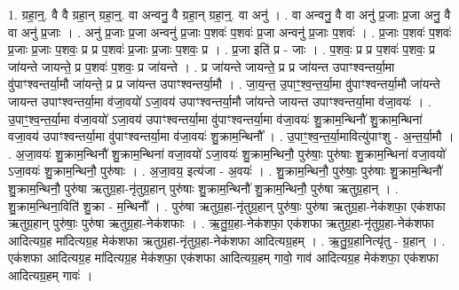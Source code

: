 \documentclass[17pt]{extarticle}
\begin{document}
1. ग्रहा॒न्॒. वै वै ग्रहा॒न् ग्रहा॒न्॒. वा अन्वनु॒ वै ग्रहा॒न् ग्रहा॒न्॒. वा अनु॑ । . वा अन्वनु॒ वै वा अनु॑ प्र॒जाः प्र॒जा अनु॒ वै वा अनु॑ प्र॒जाः । . अनु॑ प्र॒जाः प्र॒जा अन्वनु॑ प्र॒जाः प॒शवः॑ प॒शवः॑ प्र॒जा अन्वनु॑ प्र॒जाः प॒शवः॑ । . प्र॒जाः प॒शवः॑ प॒शवः॑ प्र॒जाः प्र॒जाः प॒शवः॒ प्र प्र प॒शवः॑ प्र॒जाः प्र॒जाः प॒शवः॒ प्र । . प्र॒जा इति॑ प्र - जाः । . प॒शवः॒ प्र प्र प॒शवः॑ प॒शवः॒ प्र जा॑यन्ते जायन्ते॒ प्र प॒शवः॑ प॒शवः॒ प्र जा॑यन्ते । . प्र जा॑यन्ते जायन्ते॒ प्र प्र जा॑यन्त उपाꣳश्वन्तर्या॒मा वु॑पाꣳश्वन्तर्या॒मौ जा॑यन्ते॒ प्र प्र जा॑यन्त उपाꣳश्वन्तर्या॒मौ । . जा॒य॒न्त॒ उ॒पाꣳ॒॒श्व॒न्त॒र्या॒मा वु॑पाꣳश्वन्तर्या॒मौ जा॑यन्ते जायन्त उपाꣳश्वन्तर्या॒मा व॑जा॒वयो॑ ऽजा॒वय॑ उपाꣳश्वन्तर्या॒मौ जा॑यन्ते जायन्त उपाꣳश्वन्तर्या॒मा व॑जा॒वयः॑ । . उ॒पाꣳ॒॒श्व॒न्त॒र्या॒मा व॑जा॒वयो॑ ऽजा॒वय॑ उपाꣳश्वन्तर्या॒मा वु॑पाꣳश्वन्तर्या॒मा व॑जा॒वयः॑ शु॒क्राम॒न्थिनौ॑ शु॒क्राम॒न्थिना॑ वजा॒वय॑ उपाꣳश्वन्तर्या॒मा वु॑पाꣳश्वन्तर्या॒मा व॑जा॒वयः॑ शु॒क्राम॒न्थिनौ᳚ । . उ॒पाꣳ॒॒श्व॒न्त॒र्या॒मावित्यु॑पाꣳशु - अ॒न्त॒र्या॒मौ । . अ॒जा॒वयः॑ शु॒क्राम॒न्थिनौ॑ शु॒क्राम॒न्थिना॑ वजा॒वयो॑ ऽजा॒वयः॑ शु॒क्राम॒न्थिनौ॒ पुरु॑षाः॒ पुरु॑षाः शु॒क्राम॒न्थिना॑ वजा॒वयो॑ ऽजा॒वयः॑ शु॒क्राम॒न्थिनौ॒ पुरु॑षाः । . अ॒जा॒वय॒ इत्य॑जा - अ॒वयः॑ । . शु॒क्राम॒न्थिनौ॒ पुरु॑षाः॒ पुरु॑षाः शु॒क्राम॒न्थिनौ॑ शु॒क्राम॒न्थिनौ॒ पुरु॑षा ऋतुग्र॒हा-नृ॑तुग्र॒हान् पुरु॑षाः शु॒क्राम॒न्थिनौ॑ शु॒क्राम॒न्थिनौ॒ पुरु॑षा ऋतुग्र॒हान् । . शु॒क्राम॒न्थिना॒विति॑ शु॒क्रा - म॒न्थिनौ᳚ । . पुरु॑षा ऋतुग्र॒हा-नृ॑तुग्र॒हान् पुरु॑षाः॒ पुरु॑षा ऋतुग्र॒हा-नेक॑शफा॒ एक॑शफा ऋतुग्र॒हान् पुरु॑षाः॒ पुरु॑षा ऋतुग्र॒हा-नेक॑शफाः । . ऋ॒तु॒ग्र॒हा-नेक॑शफा॒ एक॑शफा ऋतुग्र॒हा-नृ॑तुग्र॒हा-नेक॑शफा आदित्यग्र॒ह मा॑दित्यग्र॒ह मेक॑शफा ऋतुग्र॒हा-नृ॑तुग्र॒हा-नेक॑शफा आदित्यग्र॒हम् । . ऋ॒तु॒ग्र॒हानित्यृ॑तु - ग्र॒हान् । . एक॑शफा आदित्यग्र॒ह मा॑दित्यग्र॒ह मेक॑शफा॒ एक॑शफा आदित्यग्र॒हम् गावो॒ गाव॑ आदित्यग्र॒ह मेक॑शफा॒ एक॑शफा आदित्यग्र॒हम् गावः॑ । \newline
\end{document}

